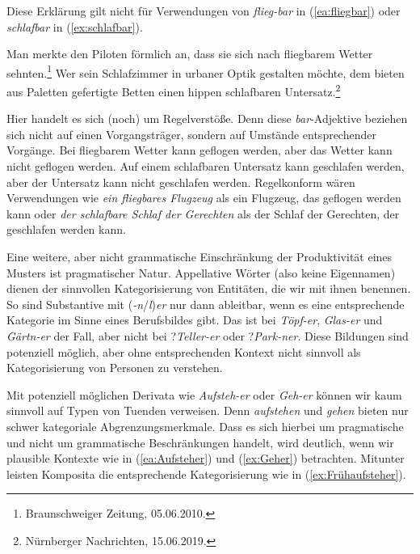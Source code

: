 Diese Erklärung gilt nicht für Verwendungen von \textit{flieg-bar} in (\ref{ea:fliegbar}) oder \textit{schlafbar} in (\ref{ex:schlafbar}).

 \ea \label{ea:schlafbar_fliegbar}
 \ea \label{ea:fliegbar} Man merkte den Piloten förmlich an, dass sie sich nach fliegbarem Wetter sehnten.\footnote{ Braunschweiger Zeitung, 05.06.2010.}
 \ex \label{ex:schlafbar} Wer sein Schlafzimmer in urbaner Optik gestalten möchte, dem bieten aus Paletten gefertigte Betten einen hippen schlafbaren Untersatz.\footnote{Nürnberger Nachrichten, 15.06.2019.}
 \z 
 \z 

 Hier handelt es sich (noch) um Regelverstöße. Denn diese \textit{bar}-Adjektive beziehen sich nicht auf einen Vorgangsträger, sondern auf Umstände entsprechender Vorgänge. Bei fliegbarem Wetter kann geflogen werden, aber das Wetter kann nicht geflogen werden. Auf einem schlafbaren Untersatz kann geschlafen werden, aber der Untersatz kann nicht geschlafen werden. Regelkonform wären Verwendungen wie \textit{ein fliegbares Flugzeug} als ein Flugzeug, das geflogen werden kann oder \textit{der schlafbare Schlaf der Gerechten} als der Schlaf der Gerechten, der geschlafen werden kann.  

Eine weitere, aber nicht grammatische Einschränkung der Produktivität eines Musters ist pragmatischer Natur. Appellative Wörter (also keine Eigennamen) dienen der sinnvollen Kategorisierung von Entitäten, die wir mit ihnen benennen. So sind Substantive mit (\textit{-n}/\textit{l})\textit{er} nur dann ableitbar, wenn es eine entsprechende Kategorie \zB im Sinne eines Berufsbildes gibt. Das ist bei \textit{Töpf-er}, \textit{Glas-er} und \textit{Gärtn-er} der Fall, aber nicht bei ?\textit{Teller-er} oder ?\textit{Park-ner}. Diese Bildungen sind potenziell möglich, aber ohne entsprechenden Kontext nicht sinnvoll als Kategorisierung von Personen zu verstehen.

Mit potenziell möglichen Derivata wie \textit{Aufsteh-er} oder \textit{Geh-er} können wir kaum sinnvoll auf Typen von Tuenden verweisen. Denn \textit{aufstehen} und \textit{gehen} bieten nur schwer kategoriale Abgrenzungsmerkmale. Dass es sich hierbei um pragmatische und nicht um grammatische Beschränkungen handelt, wird deutlich, wenn wir plausible Kontexte wie in (\ref{ea:Aufsteher}) und (\ref{ex:Geher}) betrachten. Mitunter leisten Komposita die entsprechende Kategorisierung wie in (\ref{ex:Frühaufsteher}). 


